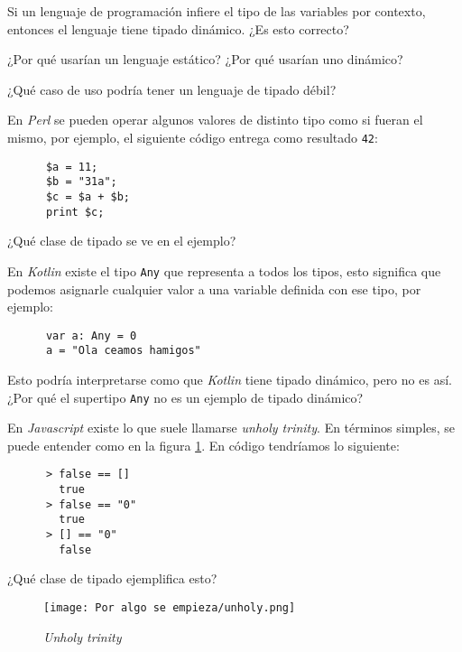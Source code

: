   \begin{exercise}
    Si un lenguaje de programación infiere el tipo de las variables por contexto, entonces el 
    lenguaje tiene tipado dinámico.
    ¿Es esto correcto?
  \end{exercise}

  \begin{exercise}
    ¿Por qué usarían un lenguaje estático?
    ¿Por qué usarían uno dinámico?
  \end{exercise}

  \begin{exercise}
    ¿Qué caso de uso podría tener un lenguaje de tipado débil?
  \end{exercise}

  \begin{exercise}
    En \textit{Perl} se pueden operar algunos valores de distinto tipo como si fueran el mismo,
    por ejemplo, el siguiente código entrega como resultado \texttt{42}:
    \begin{verbatim}
      $a = 11;
      $b = "31a";
      $c = $a + $b;
      print $c;
    \end{verbatim}

    ¿Qué clase de tipado se ve en el ejemplo?
  \end{exercise}
  
  \begin{exercise}
    En \textit{Kotlin} existe el tipo \texttt{Any} que representa a todos los tipos, 
    esto significa que podemos asignarle cualquier valor a una variable definida con ese tipo, por
    ejemplo:

    \begin{verbatim}
      var a: Any = 0
      a = "Ola ceamos hamigos"
    \end{verbatim}

    Esto podría interpretarse como que \textit{Kotlin} tiene tipado dinámico, pero no es así.
    ¿Por qué el supertipo \texttt{Any} no es un ejemplo de tipado dinámico?
  \end{exercise}

  \begin{exercise}
    En \textit{Javascript} existe lo que suele llamarse \textit{unholy trinity}.
    En términos simples, se puede entender como en la figura \ref{fig:unholy}.
    En código tendríamos lo siguiente:
    \begin{verbatim}
      > false == [] 
        true
      > false == "0"
        true
      > [] == "0"
        false
    \end{verbatim}

    ¿Qué clase de tipado ejemplifica esto?
  \end{exercise}

  \begin{figure}[ht!]
    \centering
    \texttt{[image: Por algo se empieza/unholy.png]}
    \caption{\textit{Unholy trinity}}
    \label{fig:unholy}
  \end{figure}
